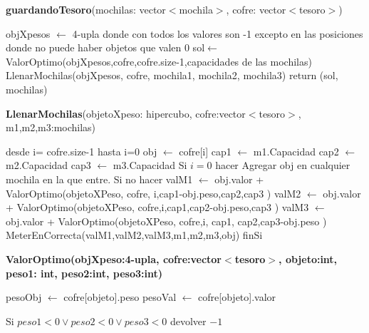 \documentclass[spanish,12pt]{article}
\begin{document}
{\begin{algorithm}[H]{\textbf{guardandoTesoro}(mochilas: vector$<$mochila$>$, cofre: vector$<$tesoro$>$)}
	\begin{algorithmic}[1]
		\State objXpesos $\gets$ 4-upla donde con todos los valores son -1 excepto en las posiciones donde no puede haber objetos que valen  0 %
		\State sol$\gets$ ValorOptimo(objXpesos,cofre,cofre.size-1,capacidades de las mochilas)
		\State LlenarMochilas(objXpesos, cofre, mochila1, mochila2, mochila3)
		\State return (sol, mochilas)
	\end{algorithmic}
\end{algorithm}



\begin{algorithm}[H]{\textbf{LlenarMochilas}(objetoXpeso: hipercubo, cofre:vector$<$tesoro$>$, m1,m2,m3:mochilas)}
	\begin{algorithmic}[1]
		\State desde i= cofre.size-1 hasta i=0
			\State \quad obj $\gets$ cofre[i]
			\State \quad cap1 $\gets$ m1.Capacidad
			\State \quad cap2 $\gets$ m2.Capacidad
			\State \quad cap3 $\gets$ m3.Capacidad
			\State \quad Si $i=0$ hacer
				\State \quad \quad Agregar obj en cualquier mochila en la que entre.
			\State \quad Si no hacer
				\State \quad \quad valM1 $\gets$ obj.valor + ValorOptimo(objetoXPeso, cofre, i,cap1-obj.peso,cap2,cap3 )
				\State \quad \quad valM2 $\gets$ obj.valor + ValorOptimo(objetoXPeso, cofre,i,cap1,cap2-obj.peso,cap3 )
				\State \quad \quad valM3 $\gets$ obj.valor + ValorOptimo(objetoXPeso, cofre,i, cap1, cap2,cap3-obj.peso )
				\State \quad \quad  MeterEnCorrecta(valM1,valM2,valM3,m1,m2,m3,obj)
			\State \quad finSi

	\end{algorithmic}
\end{algorithm}




\begin{algorithm}[H]{\textbf{ValorOptimo(objXpeso:4-upla, cofre:vector$<$tesoro$>$, objeto:int, peso1: int, peso2:int, peso3:int)}}
	\begin{algorithmic}[1]
		\State  pesoObj $\gets$ cofre[objeto].peso 
		\State  pesoVal $\gets$ cofre[objeto].valor 

		\State Si $peso1 < 0 \vee peso2 < 0 \vee peso3 < 0$
			\State \quad devolver $-1$ 


\end{algorithmic}
\end{algorithm}}
\end{document}
